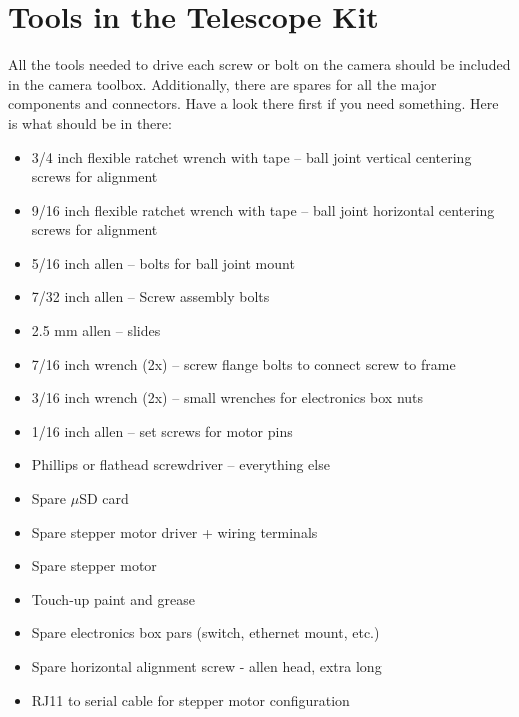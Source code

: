 \documentclass[11pt]{article}
\begin{document}
\newpage
\section{Tools in the Telescope Kit}

All the tools needed to drive each screw or bolt on the camera should be included in the camera toolbox. 
Additionally, there are spares for all the major components and connectors.
Have a look there first if you need something.
Here is what should be in there:

\begin{itemize}
	\item 3/4 inch flexible ratchet wrench with tape -- ball joint vertical centering screws for alignment
	\item 9/16 inch flexible ratchet wrench with tape -- ball joint horizontal centering screws for alignment
	\item 5/16 inch allen -- bolts for ball joint mount
	\item 7/32 inch allen -- Screw assembly bolts
	\item 2.5 mm allen -- slides
	\item 7/16 inch wrench (2x) -- screw flange bolts to connect screw to frame
	\item 3/16 inch wrench (2x) -- small wrenches for electronics box nuts
	\item 1/16 inch allen -- set screws for motor pins
	\item Phillips or flathead screwdriver -- everything else
	\item Spare $\mu$SD card
	\item Spare stepper motor driver + wiring terminals
	\item Spare stepper motor
	\item Touch-up paint and grease
	\item Spare electronics box pars (switch, ethernet mount, etc.)
	\item Spare horizontal alignment screw - allen head, extra long
	\item RJ11 to serial cable for stepper motor configuration
\end{itemize}

\newpage
\end{document}
